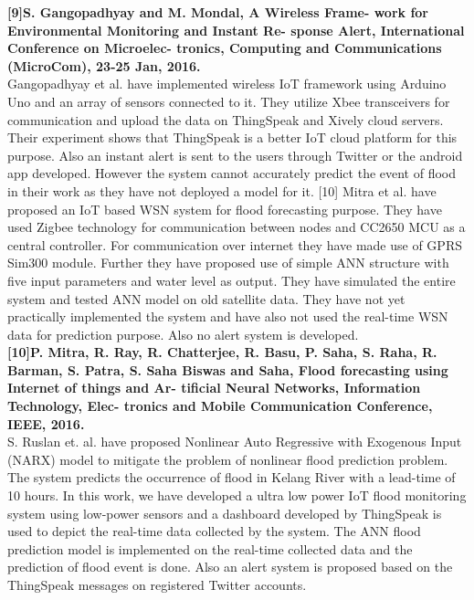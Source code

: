 \documentclass[a4paper,12pt]{report}
\begin{document}
\begin{itemize}
\textbf{[9]S. Gangopadhyay and M. Mondal, A Wireless Frame-
work for Environmental Monitoring and Instant Re-
sponse Alert, International Conference on Microelec-
tronics, Computing and Communications (MicroCom),
23-25 Jan, 2016.}
\\ Gangopadhyay et al. have implemented wireless IoT
framework using Arduino Uno and an array of sensors
connected to it. They utilize Xbee transceivers for
communication and upload the data on ThingSpeak and Xively
cloud servers. Their experiment shows that ThingSpeak is a
better IoT cloud platform for this purpose. Also an instant alert
is sent to the users through Twitter or the android app developed.
However the system cannot accurately predict the event of flood
in their work as they have not deployed a model for it. [10] Mitra
et al. have proposed an IoT based WSN system for flood
forecasting purpose. They have used Zigbee technology for
communication between nodes and CC2650 MCU as a central
controller. For communication over internet they have made use
of GPRS Sim300 module. Further they have proposed use of
simple ANN structure with five input parameters and water level
as output. They have simulated the entire system and tested
ANN model on old satellite data. They have not yet practically
implemented the system and have also not used the real-time
WSN data for prediction purpose. Also no alert system is
developed.\\
\textbf{[10]P. Mitra, R. Ray, R. Chatterjee, R. Basu, P. Saha,
S. Raha, R. Barman, S. Patra, S. Saha Biswas and Saha, Flood forecasting using Internet of things and Ar-
tificial Neural Networks, Information Technology, Elec-
tronics and Mobile Communication Conference, IEEE,
2016.}\\
 S. Ruslan et. al. have proposed Nonlinear Auto Regressive
with Exogenous Input (NARX) model to mitigate the problem of
nonlinear flood prediction problem. The system predicts the
occurrence of flood in Kelang River with a lead-time of 10
hours.
In this work, we have developed a ultra low power IoT flood
monitoring system using low-power sensors and a dashboard
developed by ThingSpeak is used to depict the real-time data
collected by the system. The ANN flood prediction model is
implemented on the real-time collected data and the prediction
of flood event is done. Also an alert system is proposed based on
the ThingSpeak messages on registered Twitter accounts. 















\end{itemize}
\end{document}
